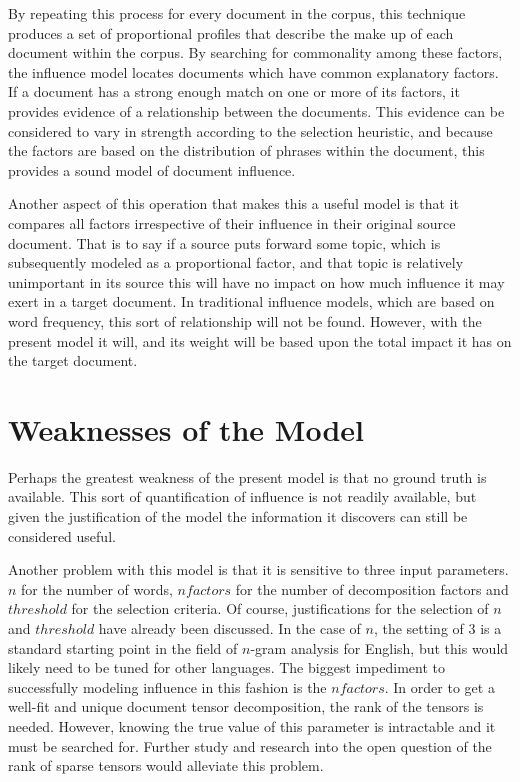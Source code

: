 \documentclass[../ut-dissertation.tex]{subfiles}
\begin{document}
By repeating this process for every document in the corpus, this
technique produces a set of proportional profiles that describe the
make up of each document within the corpus.  By searching for
commonality among these factors, the influence model locates documents
which have common explanatory factors.  If a document has a strong
enough match on one or more of its factors, it provides evidence of a
relationship between the documents.  This evidence can be considered
to vary in strength according to the selection heuristic, and because
the factors are based on the distribution of phrases within the
document, this provides a sound model of document influence.

Another aspect of this operation that makes this a useful model is
that it compares all factors irrespective of their influence in their
original source document.  That is to say if a source puts forward
some topic, which is subsequently modeled as a proportional factor,
and that topic is relatively unimportant in its source this will have
no impact on how much influence it may exert in a target document.  In
traditional influence models, which are based on word frequency, this
sort of relationship will not be found.  However, with the present
model it will, and its weight will be based upon the total impact it
has on the target document. 

\section{Weaknesses of the Model}
Perhaps the greatest weakness of the present model is that no ground
truth is available.  This sort of quantification of influence is not
readily available, but given the justification of the model the
information it discovers can still be considered useful.

Another problem with this model is that it is sensitive to three input
parameters.  $n$ for the number of words, $nfactors$ for the number of
decomposition factors and $threshold$ for the selection criteria.  Of
course, justifications for the selection of $n$ and $threshold$ have
already been discussed.  In the case of $n$, the setting of 3 is a
standard starting point in the field of $n$-gram analysis for English,
but this would likely need to be tuned for other languages.  The
biggest impediment to successfully modeling influence in this fashion
is the $nfactors$.  In order to get a well-fit and unique document
tensor decomposition, the rank of the tensors is needed.  However,
knowing the true value of this parameter is intractable and it must be
searched for.  Further study and research into the open question of
the rank of sparse tensors would alleviate this problem.
\end{document}
